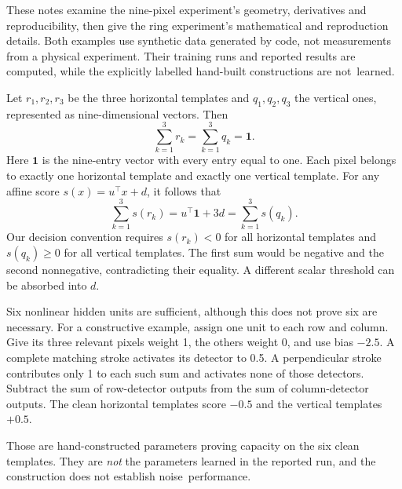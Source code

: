 \begingroup
\setlength{\leftskip}{0pt}
\setlength{\rightskip}{0pt}
\setlength{\parfillskip}{0pt plus 1fil}
\setlength{\parindent}{0pt}
\setlength{\parskip}{2pt}

These notes examine the nine-pixel experiment's geometry, derivatives and reproducibility, then give the ring experiment's mathematical and reproduction details. Both examples use synthetic data generated by code, not measurements from a physical experiment. Their training runs and reported results are computed, while the explicitly labelled hand-built constructions are not~learned.




\Needspace{65mm}

Let $r_1,r_2,r_3$ be the three horizontal templates and $q_1,q_2,q_3$ the vertical ones, represented as nine-dimensional vectors. Then
\[
\sum_{k=1}^3 r_k=\sum_{k=1}^3 q_k=\boldsymbol{1}.
\]
Here $\boldsymbol{1}$ is the nine-entry vector with every entry equal to one. Each pixel belongs to exactly one horizontal template and exactly one vertical template. For any affine score $s(x)=u^\top x+d$, it follows that
\[
\sum_{k=1}^3s(r_k)=u^\top\boldsymbol{1}+3d
=\sum_{k=1}^3s(q_k).
\]
Our decision convention requires $s(r_k)<0$ for all horizontal templates and $s(q_k)\geq0$ for all vertical templates. The first sum would be negative and the second nonnegative, contradicting their equality. A different scalar threshold can be absorbed into $d$.

Six nonlinear hidden units are sufficient, although this does not prove six are necessary. For a constructive example, assign one unit to each row and column. Give its three relevant pixels weight 1, the others weight 0, and use bias $-2.5$. A complete matching stroke activates its detector to 0.5. A perpendicular stroke contributes only 1 to each such sum and activates none of those detectors. Subtract the sum of row-detector outputs from the sum of column-detector outputs. The clean horizontal templates score $-0.5$ and the vertical templates $+0.5$.

Those are hand-constructed parameters proving capacity on the six clean templates. They are \emph{not} the parameters learned in the reported run, and the construction does not establish noise~performance.



\label{note:v29-gradient}

